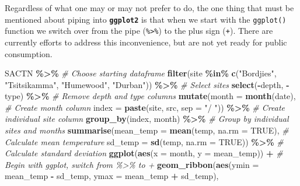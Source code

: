 \documentclass[
]{book}
\newenvironment{Shaded}{\begin{snugshade}}{\end{snugshade}}
\newcommand{\CommentTok}[1]{\textcolor[rgb]{0.56,0.35,0.01}{\textit{#1}}}
\newcommand{\DataTypeTok}[1]{\textcolor[rgb]{0.13,0.29,0.53}{#1}}
\newcommand{\KeywordTok}[1]{\textcolor[rgb]{0.13,0.29,0.53}{\textbf{#1}}}
\newcommand{\NormalTok}[1]{#1}
\newcommand{\OperatorTok}[1]{\textcolor[rgb]{0.81,0.36,0.00}{\textbf{#1}}}
\newcommand{\OtherTok}[1]{\textcolor[rgb]{0.56,0.35,0.01}{#1}}
\newcommand{\StringTok}[1]{\textcolor[rgb]{0.31,0.60,0.02}{#1}}
\begin{document}
Regardless of what one may or may not prefer to do, the one thing that must be mentioned about piping into \textbf{\texttt{ggplot2}} is that when we start with the \texttt{ggplot()} function we switch over from the pipe (\texttt{\%\textgreater{}\%})
to the plus sign (\texttt{+}). There are currently efforts to address this inconvenience, but are not yet ready for public consumption.

\begin{Shaded}
\begin{Highlighting}[]
\NormalTok{SACTN }\OperatorTok{\%>\%}\StringTok{ }\CommentTok{\# Choose starting dataframe}
\StringTok{  }\KeywordTok{filter}\NormalTok{(site }\OperatorTok{\%in\%}\StringTok{ }\KeywordTok{c}\NormalTok{(}\StringTok{"Bordjies"}\NormalTok{, }\StringTok{"Tsitsikamma"}\NormalTok{, }\StringTok{"Humewood"}\NormalTok{, }\StringTok{"Durban"}\NormalTok{)) }\OperatorTok{\%>\%}\StringTok{ }\CommentTok{\# Select sites}
\StringTok{  }\KeywordTok{select}\NormalTok{(}\OperatorTok{{-}}\NormalTok{depth, }\OperatorTok{{-}}\NormalTok{type) }\OperatorTok{\%>\%}\StringTok{ }\CommentTok{\# Remove depth and type columns}
\StringTok{  }\KeywordTok{mutate}\NormalTok{(}\DataTypeTok{month =} \KeywordTok{month}\NormalTok{(date), }\CommentTok{\# Create month column}
         \DataTypeTok{index =} \KeywordTok{paste}\NormalTok{(site, src, }\DataTypeTok{sep =} \StringTok{"/ "}\NormalTok{)) }\OperatorTok{\%>\%}\StringTok{ }\CommentTok{\# Create individual site column}
\StringTok{  }\KeywordTok{group\_by}\NormalTok{(index, month) }\OperatorTok{\%>\%}\StringTok{ }\CommentTok{\# Group by individual sites and months}
\StringTok{  }\KeywordTok{summarise}\NormalTok{(}\DataTypeTok{mean\_temp =} \KeywordTok{mean}\NormalTok{(temp, }\DataTypeTok{na.rm =} \OtherTok{TRUE}\NormalTok{), }\CommentTok{\# Calculate mean temperature}
            \DataTypeTok{sd\_temp =} \KeywordTok{sd}\NormalTok{(temp, }\DataTypeTok{na.rm =} \OtherTok{TRUE}\NormalTok{)) }\OperatorTok{\%>\%}\StringTok{ }\CommentTok{\# Calculate standard deviation}
\StringTok{  }\KeywordTok{ggplot}\NormalTok{(}\KeywordTok{aes}\NormalTok{(}\DataTypeTok{x =}\NormalTok{ month, }\DataTypeTok{y =}\NormalTok{ mean\_temp)) }\OperatorTok{+}\StringTok{ }\CommentTok{\# Begin with ggplot, switch from \textquotesingle{}\%>\%\textquotesingle{} to \textquotesingle{}+\textquotesingle{}}
\StringTok{  }\KeywordTok{geom\_ribbon}\NormalTok{(}\KeywordTok{aes}\NormalTok{(}\DataTypeTok{ymin =}\NormalTok{ mean\_temp }\OperatorTok{{-}}\StringTok{ }\NormalTok{sd\_temp, }\DataTypeTok{ymax =}\NormalTok{ mean\_temp }\OperatorTok{+}\StringTok{ }\NormalTok{sd\_temp), }

\end{Highlighting}
\end{Shaded}
\end{document}
